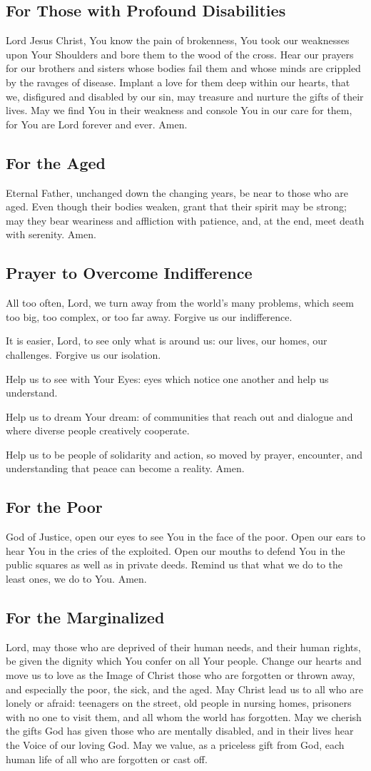 \documentclass[12pt]{article}
\newcommand{\prayertitle}[1]{\subsection{#1}}
\begin{document}
\prayertitle{For Those with Profound Disabilities}
\label{prayer:profound_disabilities}
Lord Jesus Christ, 
You know the pain of brokenness, You took our weaknesses upon Your Shoulders and bore them to the wood of the cross.
Hear our prayers for our brothers and sisters whose bodies fail them and whose minds are crippled by the ravages of disease.
Implant a love for them deep within our hearts, that we, disfigured and disabled by our sin, may treasure and nurture the gifts of their lives.
May we find You in their weakness and console You in our care for them, for You are Lord forever and ever.
Amen.

\prayertitle{For the Aged}
Eternal Father, unchanged down the changing years, be near to those who are aged.
Even though their bodies weaken, grant that their spirit may be strong; may they bear weariness and affliction with patience, and, at the end, meet death with serenity.
Amen.

\prayertitle{Prayer to Overcome Indifference}
\label{prayer:indifference}
All too often, Lord, we turn away from the world's many problems, which seem too big, too complex, or too far away.
Forgive us our indifference.

It is easier, Lord, to see only what is around us:
our lives, our homes, our challenges.
Forgive us our isolation.

Help us to see with Your Eyes:
eyes which notice one another and help us understand.

Help us to dream Your dream:
of communities that reach out and dialogue and where diverse people creatively cooperate.

Help us to be people of solidarity and action, so moved by prayer, encounter, and understanding that peace can become a reality.
Amen.

\prayertitle{For the Poor}
\label{prayer:poor}
God of Justice, open our eyes to see You in the face of the poor.
Open our ears to hear You in the cries of the exploited.
Open our mouths to defend You in the public squares as well as in private deeds.
Remind us that what we do to the least ones, we do to You.
Amen.

\prayertitle{For the Marginalized}
\label{prayer:marginalized}
Lord, may those who are deprived of their human needs, and their human rights, be given the dignity which You confer on all Your people.
Change our hearts and move us to love as the Image of Christ those who are forgotten or thrown away, and especially the poor, the sick, and the aged.
May Christ lead us to all who are lonely or afraid: teenagers on the street, old people in nursing homes, prisoners with no one to visit them, and all whom the world has forgotten.
May we cherish the gifts God has given those who are mentally disabled,
and in their lives hear the Voice of our loving God.
May we value, as a priceless gift from God, each human life of all who are forgotten or cast off.
\end{document}
